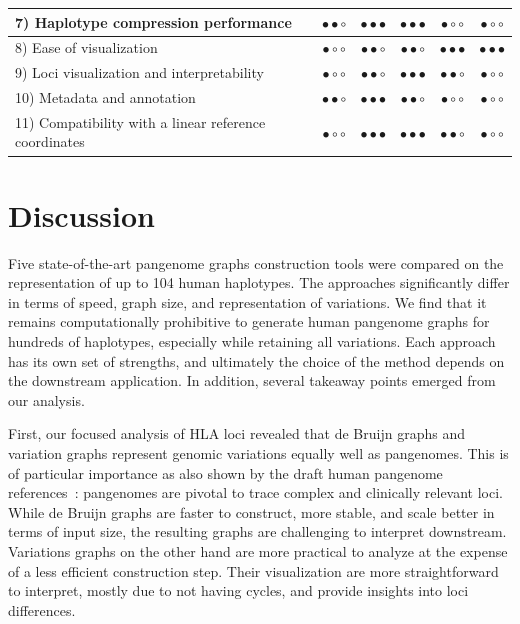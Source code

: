 \begin{table}
{\begin{tabular}{|l c c c c c|}
			\hline
			7) Haplotype compression performance & $\bullet\bullet\circ$ & $\bullet\bullet\bullet$ & $\bullet\bullet\bullet$ & $\bullet\circ\circ$ & $\bullet\circ\circ$\\
			\hline
			8) Ease of visualization  & $\bullet\circ\circ$ & $\bullet\bullet\circ$ & $\bullet\bullet\circ$ & $\bullet\bullet\bullet$ & $\bullet\bullet\bullet$ \\
			\hline
			9) Loci visualization and interpretability   & $\bullet\circ\circ$ & $\bullet\bullet\circ$& $\bullet\bullet\bullet$ & $\bullet\bullet\circ$  & $\bullet\circ\circ$\\
			\hline
			10) Metadata and annotation   & $\bullet\bullet\circ$ & $\bullet\bullet\bullet$ & $\bullet\bullet\circ$ & $\bullet\circ\circ$  & $\bullet\circ\circ$\\
			\hline
			11) Compatibility with a linear reference coordinates & $\bullet\circ\circ$ & $\bullet\bullet\bullet$ & $\bullet\bullet\bullet$ & $\bullet\bullet\circ$  & $\bullet\circ\circ$\\
			\hline
	\end{tabular}}
	\label{tab:tools_consideration}
\end{table}

\section{Discussion}
Five state-of-the-art pangenome graphs construction tools were compared on the representation of up to 104 human haplotypes. The approaches significantly differ in terms of speed, graph size, and representation of variations. We find that it remains computationally prohibitive to generate human pangenome graphs for hundreds of haplotypes, especially while retaining all variations. Each approach has its own set of strengths, and ultimately the choice of the method depends on the downstream application. In addition, several takeaway points emerged from our analysis.

First, our focused analysis of HLA loci revealed that de Bruijn graphs and variation graphs represent genomic variations equally well as pangenomes.  This is of particular importance as also shown by the draft human pangenome references~\mbox{\cite{hdpr}}: pangenomes are pivotal to trace complex and clinically relevant loci. While de Bruijn graphs are faster to construct, more stable, and scale better in terms of input size, the resulting graphs are challenging to interpret downstream. Variations graphs on the other hand are more practical to analyze at the expense of a less efficient construction step. Their visualization are more straightforward to interpret, mostly due to not having cycles, and provide insights into loci differences. 

